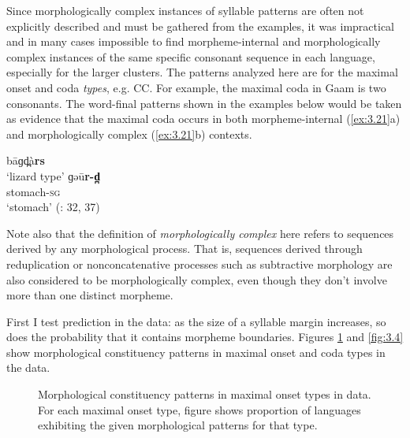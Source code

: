   Since morphologically complex instances of syllable patterns are often not explicitly described and must be gathered from the examples, it was impractical and in many cases impossible to find morpheme-internal and morphologically complex instances of the same specific consonant sequence in each language, especially for the larger clusters. The patterns analyzed here are for the maximal onset and coda \textit{types}, e.g. CC. For example, the maximal coda in Gaam is two consonants. The word-final patterns shown in the examples below would be taken as evidence that the maximal coda occurs in both morpheme-internal (\ref{ex:3.21}a) and morphologically complex (\ref{ex:3.21}b) contexts.

\ea\label{ex:3.21}

\ea  bāɡd̪à\textbf{rs}\\
\glt ‘lizard type’
\ex  ɡəū\textbf{r-d̪}\\
stomach-\textsc{sg}\\
\glt ‘stomach’
(\citealt{Stirtz2011}: 32, 37)
\z
\z

  Note also that the definition of \textit{morphologically complex} here refers to sequences derived by any morphological process. That is, sequences derived through reduplication or nonconcatenative processes such as subtractive morphology are also considered to be morphologically complex, even though they don’t involve more than one distinct morpheme.

  First I test  prediction in the data: as the size of a syllable margin increases, so does the probability that it contains morpheme boundaries. Figures \ref{fig:3.3} and \ref{fig:3.4} show morphological constituency patterns in maximal onset and coda types in the data.

  
\begin{figure}
\caption{\label{fig:3.3}Morphological constituency patterns in maximal onset types in data. For each maximal onset type, figure shows proportion of languages exhibiting the given morphological patterns for that type.}
\end{figure}


